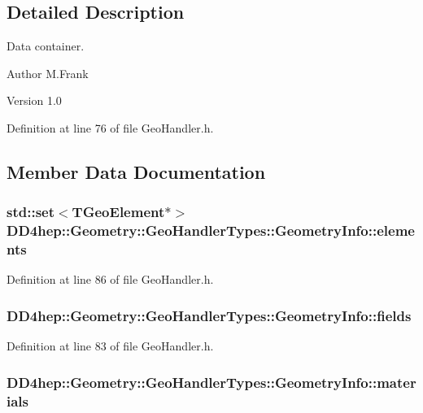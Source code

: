 \subsection{Detailed Description}
Data container. \begin{DoxyAuthor}{Author}
M.Frank 
\end{DoxyAuthor}
\begin{DoxyVersion}{Version}
1.0 
\end{DoxyVersion}


Definition at line 76 of file GeoHandler.h.

\subsection{Member Data Documentation}
\hypertarget{class_d_d4hep_1_1_geometry_1_1_geo_handler_types_1_1_geometry_info_af3241402a1b5a44a99cebf1f826f8b0f}{
\subsubsection[{elements}]{\setlength{\rightskip}{0pt plus 5cm}std::set$<$TGeoElement$\ast$$>$ {\bf DD4hep::Geometry::GeoHandlerTypes::GeometryInfo::elements}}}
\label{class_d_d4hep_1_1_geometry_1_1_geo_handler_types_1_1_geometry_info_af3241402a1b5a44a99cebf1f826f8b0f}


Definition at line 86 of file GeoHandler.h.\hypertarget{class_d_d4hep_1_1_geometry_1_1_geo_handler_types_1_1_geometry_info_a5865cf29de9b97cec253fdc6295d3ece}{
\subsubsection[{fields}]{ {\bf DD4hep::Geometry::GeoHandlerTypes::GeometryInfo::fields}}}
\label{class_d_d4hep_1_1_geometry_1_1_geo_handler_types_1_1_geometry_info_a5865cf29de9b97cec253fdc6295d3ece}


Definition at line 83 of file GeoHandler.h.\hypertarget{class_d_d4hep_1_1_geometry_1_1_geo_handler_types_1_1_geometry_info_a4a14f49297ddc460b835c6317ed757d9}{
\subsubsection[{materials}]{ {\bf DD4hep::Geometry::GeoHandlerTypes::GeometryInfo::materials}}}
\label{class_d_d4hep_1_1_geometry_1_1_geo_handler_types_1_1_geometry_info_a4a14f49297ddc460b835c6317ed757d9}


